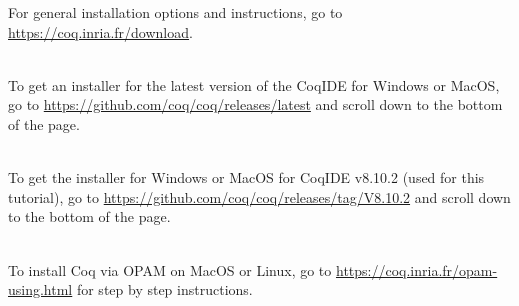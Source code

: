 
For general installation options and instructions, go to
\url{https://coq.inria.fr/download}.

~\\
To get an installer for the latest version of the 
CoqIDE for Windows or MacOS, go to 
\url{https://github.com/coq/coq/releases/latest}
and scroll down to the bottom of the page.

~\\ 
To get the installer for Windows or MacOS for 
CoqIDE v8.10.2 (used for this tutorial), go to 
\url{https://github.com/coq/coq/releases/tag/V8.10.2} 
and scroll down to the bottom of the page. 

~\\
To install Coq via OPAM on MacOS or Linux, go to 
\url{https://coq.inria.fr/opam-using.html}
for step by step instructions.
